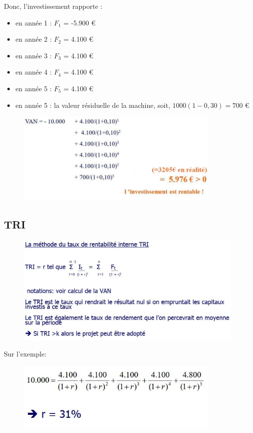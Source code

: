 \documentclass{article}
\begin{document}
Donc, l’investissement rapporte :
\begin{itemize}
	\item en année 1 : $F_1$ = -5.900 \euro{}
	\item en année 2 : $F_2$	= 	4.100 \euro{}
	\item en année 3 : $F_3$	= 	4.100 \euro{}
	\item en année 4 :	$F_4$	= 	4.100 \euro{}
	\item en année 5 : $F_5$	= 	4.100 	\euro{}
	\item en année 5 : la valeur résiduelle de la machine, soit, $1000 (1-0,30) = 700$ \euro{}
\end{itemize}
\begin{figure}[H]
	\includegraphics[width=10cm]{van-rentabilite.jpg}
\end{figure}

\subsection{TRI}

\begin{figure}[H]
	\centering
	\includegraphics[width=14cm]{tri.jpg}
\end{figure}

Sur l'exemple:

\begin{figure}[H]
	\includegraphics[width=10cm]{tri-exemple.jpg}
\end{figure}
\end{document}
